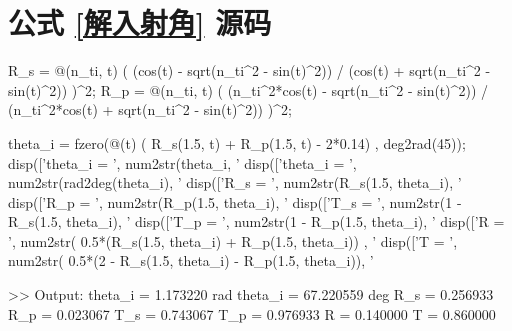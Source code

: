 \documentclass[UTF8]{report}
\theoremstyle{MyLineTheoremStyle} %
\theoremstyle{MyBlockTheoremStyle} %
\theoremstyle{MySubsubsectionStyle} %
\begin{document}
\section{公式 \ref{解入射角} 源码}\label{公式解入射角源码}

\begin{matlablisting}
R_s = @(n_ti, t) ( (cos(t) - sqrt(n_ti^2 - sin(t)^2)) / (cos(t) + sqrt(n_ti^2 - sin(t)^2)) )^2;
R_p = @(n_ti, t) ( (n_ti^2*cos(t) - sqrt(n_ti^2 - sin(t)^2)) / (n_ti^2*cos(t) + sqrt(n_ti^2 - sin(t)^2)) )^2;

theta_i = fzero(@(t) ( R_s(1.5, t) + R_p(1.5, t) - 2*0.14) , deg2rad(45));
disp(['theta_i = ', num2str(theta_i, '%
disp(['theta_i = ', num2str(rad2deg(theta_i), '%
disp(['R_s = ', num2str(R_s(1.5, theta_i), '%
disp(['R_p = ', num2str(R_p(1.5, theta_i), '%
disp(['T_s = ', num2str(1 - R_s(1.5, theta_i), '%
disp(['T_p = ', num2str(1 - R_p(1.5, theta_i), '%
disp(['R = ', num2str( 0.5*(R_s(1.5, theta_i) + R_p(1.5, theta_i)) , '%
disp(['T = ', num2str( 0.5*(2 - R_s(1.5, theta_i) - R_p(1.5, theta_i)), '%

>> Output:
theta_i = 1.173220 rad
theta_i = 67.220559 deg
R_s = 0.256933
R_p = 0.023067
T_s = 0.743067
T_p = 0.976933
R = 0.140000
T = 0.860000
\end{matlablisting}


\end{document}
